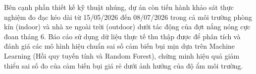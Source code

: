 \documentclass[12pt,a4paper,oneside]{report}
\begin{document}
Bên cạnh phần thiết kế kỹ thuật nhúng, dự án còn tiến hành khảo sát thực nghiệm đo đạc kéo dài từ 15/05/2026 đến 08/07/2026 trong cả môi trường phòng kín (indoor) và nhà xe ngoài trời (outdoor) dưới tác động của đợt nắng nóng cực đoan tháng 6. Báo cáo sử dụng dữ liệu thực tế thu thập được để phân tích và đánh giá các mô hình hiệu chuẩn sai số cảm biến bụi mịn dựa trên Machine Learning (Hồi quy tuyến tính và Random Forest), chứng minh hiệu quả giảm thiểu sai số đo của cảm biến bụi giá rẻ dưới ảnh hưởng của độ ẩm môi trường.

\tableofcontents
\newpage

\listoffigures
\newpage

\listoftables
\newpage











\appendix



\end{document}
